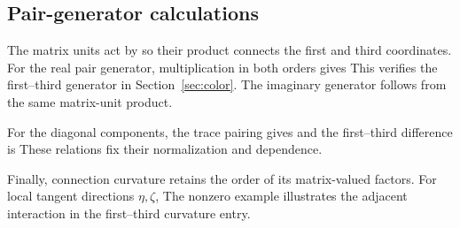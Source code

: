 \subsection{Pair-generator calculations}
The matrix units act by
\AlgebraMatrixUnitExampleDisplay
so their product connects the first and third coordinates. For the real pair generator,
\AlgebraGeneratorActionDisplay
multiplication in both orders gives
\AlgebraBracketProductsDisplay
This verifies the first--third generator in Section~\ref{sec:color}. The imaginary generator follows from the same matrix-unit product.

For the diagonal components, the trace pairing gives
\AlgebraDiagonalNormExampleDisplay
and the first--third difference is
\AlgebraDiagonalExpansionDisplay
These relations fix their normalization and dependence.

Finally, connection curvature retains the order of its matrix-valued factors. For local tangent directions $\eta,\zeta$,
\AlgebraWedgeExampleDisplay
The nonzero example illustrates the adjacent interaction in the first--third curvature entry.

